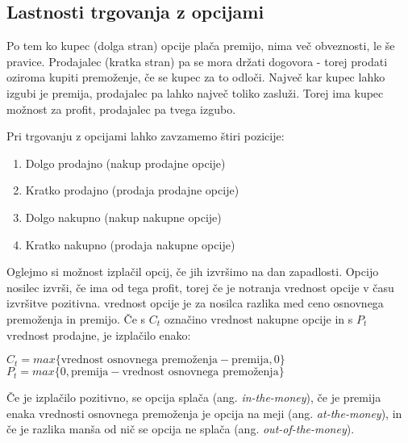 \documentclass[a4paper]{article}
\begin{document}
\subsection{Lastnosti trgovanja z opcijami}
Po tem ko kupec (dolga stran) opcije plača premijo, nima več obveznosti, le še pravice. Prodajalec (kratka stran) pa se mora držati dogovora - torej prodati
oziroma kupiti premoženje, če se kupec za to odloči. Največ kar kupec lahko izgubi je premija,
prodajalec pa lahko največ toliko zasluži. Torej ima kupec možnost za profit, prodajalec pa tvega izgubo.

Pri trgovanju z opcijami lahko zavzamemo štiri pozicije:
\begin{enumerate}
    \item Dolgo prodajno (nakup prodajne opcije)
    \item Kratko prodajno (prodaja prodajne opcije)
    \item Dolgo nakupno (nakup nakupne opcije)
    \item Kratko nakupno (prodaja nakupne opcije)
\end{enumerate}
Oglejmo si možnost izplačil opcij, če jih izvršimo na dan zapadlosti. Opcijo nosilec izvrši, če ima od tega profit, torej
če je notranja vrednost opcije v času izvršitve pozitivna. vrednost opcije je za nosilca razlika med ceno osnovnega premoženja in premijo.
Če s $C_{t}$ označino vrednost nakupne opcije in s $P_{t}$ vrednost prodajne, je izplačilo enako:
\begin{center}
$C_{t} = max\{\text{vrednost osnovnega premoženja} - \text{premija}, 0\}$ \\
$P_{t} = max\{0, \text{premija} - \text{vrednost osnovnega premoženja}\}$
\end{center}
Če je izplačilo pozitivno, se opcija splača (ang. \textit{in-the-money}), če je premija enaka vrednosti osnovnega premoženja
je opcija na meji (ang. \textit{at-the-money}), in če je razlika manša od nič se opcija ne splača (ang. \textit{out-of-the-money}).
\end{document}
